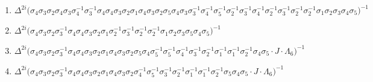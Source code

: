 \begin{enumerate}
    \item $\displaystyle \Delta^{2i} \big( \allowbreak\sigma_{4}\allowbreak\sigma_{3}\allowbreak\sigma_{2}\allowbreak\sigma_{4}\allowbreak\sigma_{3}\allowbreak\sigma_{4}^{-1}\allowbreak\sigma_{3}^{-1}\allowbreak\sigma_{4}\allowbreak\sigma_{4}\allowbreak\sigma_{3}\allowbreak\sigma_{2}\allowbreak\sigma_{1}\allowbreak\sigma_{4}\allowbreak\sigma_{3}\allowbreak\sigma_{2}\allowbreak\sigma_{5}\allowbreak\sigma_{4}\allowbreak\sigma_{3}\allowbreak\sigma_{3}^{-1}\allowbreak\sigma_{4}^{-1}\allowbreak\sigma_{5}^{-1}\allowbreak\sigma_{2}^{-1}\allowbreak\sigma_{3}^{-1}\allowbreak\sigma_{4}^{-1}\allowbreak\sigma_{2}^{-1}\allowbreak\sigma_{3}^{-1}\allowbreak\sigma_{2}^{-1}\allowbreak\sigma_{2}^{-1}\allowbreak\sigma_{1}\allowbreak\sigma_{2}\allowbreak\sigma_{3}\allowbreak\sigma_{4}\allowbreak\sigma_{5} \big)^{-1}$
    \item $\displaystyle \Delta^{2i} \big( \allowbreak\sigma_{4}\allowbreak\sigma_{3}\allowbreak\sigma_{2}\allowbreak\sigma_{3}^{-1}\allowbreak\sigma_{4}\allowbreak\sigma_{4}\allowbreak\sigma_{3}\allowbreak\sigma_{2}\allowbreak\sigma_{1}\allowbreak\sigma_{2}^{-1}\allowbreak\sigma_{3}^{-1}\allowbreak\sigma_{2}^{-1}\allowbreak\sigma_{2}^{-1}\allowbreak\sigma_{1}\allowbreak\sigma_{2}\allowbreak\sigma_{3}\allowbreak\sigma_{5}\allowbreak\sigma_{4}\allowbreak\sigma_{5} \big)^{-1}$
    \item $\displaystyle \Delta^{2i} \big( \allowbreak\sigma_{4}\allowbreak\sigma_{3}\allowbreak\sigma_{2}\allowbreak\sigma_{3}^{-1}\allowbreak\sigma_{4}\allowbreak\sigma_{4}\allowbreak\sigma_{3}\allowbreak\sigma_{2}\allowbreak\sigma_{1}\allowbreak\sigma_{4}\allowbreak\sigma_{3}\allowbreak\sigma_{2}\allowbreak\sigma_{5}\allowbreak\sigma_{4}\allowbreak\sigma_{5}^{-1}\allowbreak\sigma_{5}^{-1}\allowbreak\sigma_{4}^{-1}\allowbreak\sigma_{3}^{-1}\allowbreak\sigma_{2}^{-1}\allowbreak\sigma_{1}^{-1}\allowbreak\sigma_{1}^{-1}\allowbreak\sigma_{2}^{-1}\allowbreak\sigma_{4}\allowbreak\sigma_{5} \cdot J \cdot \Lambda_6 \big)^{-1}$
    \item $\displaystyle \Delta^{2i} \big( \allowbreak\sigma_{4}\allowbreak\sigma_{3}\allowbreak\sigma_{2}\allowbreak\sigma_{3}^{-1}\allowbreak\sigma_{4}\allowbreak\sigma_{4}\allowbreak\sigma_{3}\allowbreak\sigma_{2}\allowbreak\sigma_{1}\allowbreak\sigma_{4}\allowbreak\sigma_{3}\allowbreak\sigma_{2}\allowbreak\sigma_{4}^{-1}\allowbreak\sigma_{5}^{-1}\allowbreak\sigma_{3}^{-1}\allowbreak\sigma_{2}^{-1}\allowbreak\sigma_{1}^{-1}\allowbreak\sigma_{1}^{-1}\allowbreak\sigma_{2}^{-1}\allowbreak\sigma_{5}\allowbreak\sigma_{4}\allowbreak\sigma_{5} \cdot J \cdot \Lambda_6 \big)^{-1}$

\end{enumerate}
